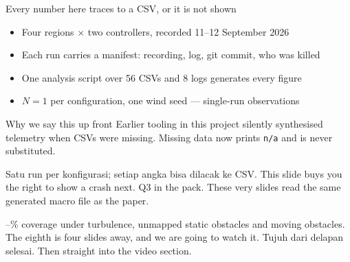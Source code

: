 \documentclass[aspectratio=169,11pt,t]{beamer}
\renewcommand{\sectioncount}{9}
\begin{document}
\begin{frame}{Every number here traces to a CSV, or it is not shown}
  \begin{itemize}\bulletgap
    \item Four regions $\times$ two controllers, recorded 11--12 September 2026
    \item Each run carries a manifest: recording, log, git commit, who was killed
    \item One analysis script over 56 CSVs and 8 logs generates every figure
    \item $N=1$ per configuration, one wind seed --- single-run observations
  \end{itemize}
  \vfill
  \begin{callout}{Why we say this up front}
    Earlier tooling in this project silently synthesised telemetry when CSVs were
    missing. Missing data now prints \texttt{n/a} and is never substituted.
  \end{callout}
    {Satu run per konfigurasi; setiap angka bisa dilacak ke CSV.}
    {This slide buys you the right to show a crash next. Q3 in the pack.
        These very slides read the same generated macro file as the paper.}
\end{frame}

\kick{Missions}{7 / \sectioncount}

\begin{frame}
    {\CovMin--\CovMax\% coverage under turbulence, unmapped static obstacles and
     moving obstacles. The eighth is four slides away, and we are going to watch it.}
    {Tujuh dari delapan selesai.}
    {Then straight into the video section.}
\end{frame}
\end{document}
